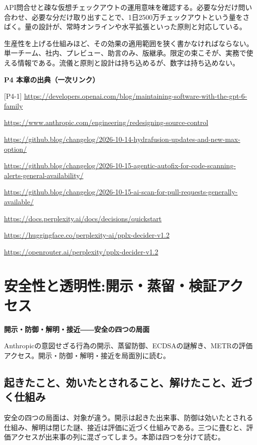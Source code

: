 \documentclass[lualatex,a4paper,10pt]{jlreq}
\begin{document}
API問合せと疎な仮想チェックアウトの運用意味を確認する。必要な分だけ問い合わせ、必要な分だけ取り出すことで、1日2500万チェックアウトという量をさばく。量の設計が、常時オンラインや水平拡張といった原則と対応している。

生産性を上げる仕組みほど、その効果の適用範囲を狭く書かなければならない。単一チーム、社内、プレビュー、助言のみ、版継承。限定の束こそが、実務で使える情報である。流儀と原則と設計は持ち込めるが、数字は持ち込めない。

\begin{tcolorbox}[colback=white,colframe=SurveyRule,arc=1mm,boxrule=0.4pt,left=2mm,right=2mm]
\textbf{P4 本章の出典（一次リンク）}\par\footnotesize
[P4-1] \url{https://developers.openai.com/blog/maintaining-software-with-the-gpt-6-family}\par
[P4-2] \url{https://www.anthropic.com/engineering/redesigning-source-control}\par
[P4-3] \url{https://github.blog/changelog/2026-10-14-hydrafusion-updates-and-new-max-option/}\par
[P4-4] \url{https://github.blog/changelog/2026-10-15-agentic-autofix-for-code-scanning-alerts-general-availability/}\par
[P4-5] \url{https://github.blog/changelog/2026-10-15-ai-scan-for-pull-requests-generally-available/}\par
[P4-6] \url{https://docs.perplexity.ai/docs/decisions/quickstart}\par
[P4-7] \url{https://huggingface.co/perplexity-ai/pplx-decider-v1.2}\par
[P4-8] \url{https://openrouter.ai/perplexity/pplx-decider-v1.2}\par
\end{tcolorbox}

\section{安全性と透明性:開示・蒸留・検証アクセス}
\label{sec:P5}

{\Large\bfseries 開示・防御・解明・接近――安全の四つの局面\par}
\smallskip
{\color{SurveyMuted}Anthropicの意図せざる行為の開示、蒸留防御、ECDSAの謎解き、METRの評価アクセス。開示・防御・解明・接近を局面別に読む。\par}
\bigskip

\subsection*{起きたこと、効いたとされること、解けたこと、近づく仕組み}
安全の四つの局面は、対象が違う。開示は起きた出来事、防御は効いたとされる仕組み、解明は閉じた謎、接近は評価に近づく仕組みである。三つに畳むと、評価アクセスが出来事の列に混ざってしまう。本節は四つを分けて読む。
\end{document}
